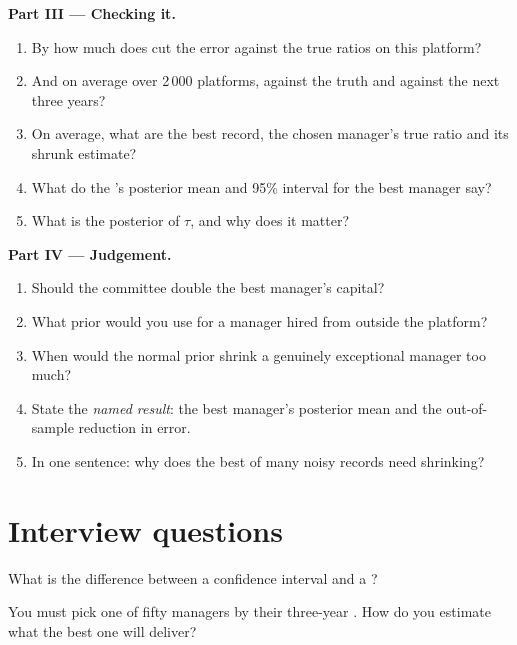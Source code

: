 \begin{problem}
\medskip\noindent\textbf{Part III --- Checking it.}
\begin{enumerate}[resume]
\item By how much does  cut the error against the true ratios on this platform?
\item And on average over 2\,000 platforms, against the truth and against the next three years?
\item On average, what are the best record, the chosen manager's true ratio and its shrunk estimate?
\item What do the 's posterior mean and 95\% interval for the best manager say?
\item What is the posterior of $\tau$, and why does it matter?
\end{enumerate}

\medskip\noindent\textbf{Part IV --- Judgement.}
\begin{enumerate}[resume]
\item Should the committee double the best manager's capital?
\item What prior would you use for a manager hired from outside the platform?
\item When would the normal prior shrink a genuinely exceptional manager too much?
\item State the \emph{named result}: the best manager's posterior mean and the out-of-sample reduction in error.
\item In one sentence: why does the best of many noisy records need shrinking?
\end{enumerate}
\end{problem}

\section{Interview questions}

\begin{interviewq}\label{iq:qm:bayesian-methods:1}
What is the difference between a confidence interval and a ?
\end{interviewq}

\begin{interviewq}\label{iq:qm:bayesian-methods:2}
You must pick one of fifty managers by their three-year . How do you estimate what the best one will deliver?
\end{interviewq}

